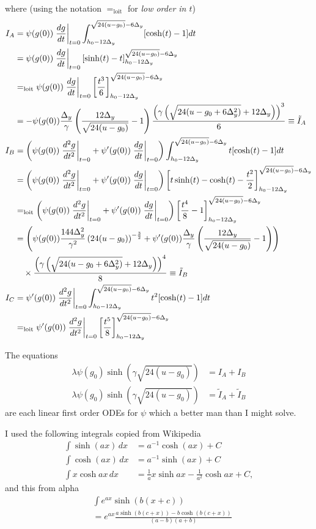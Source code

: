 \documentclass[]{article}
\begin{document}
\newcommand{\loit}{=_\text{loit}}
\newcommand{\DG}{\frac{\Delta_y}{\gamma} \left( \frac{12 \Delta_y}
    { \sqrt{24(u-g_0)} } - 1 \right) }
\newcommand{\DDG}{\frac{144 \Delta^2_y}{\gamma^2} \left(24(u-g_0)
  \right)^{-\frac{3}{2}} }
where (using the notation $\loit$ for \emph{low order in $t$})
\begin{align*}
  I_{A} &= \psi(g(0)) \left. \frac{d g}{d t} \right|_{t=0}
  \INT [\cosh(t) - 1] dt \\
  &= \psi(g(0)) \left. \frac{d g}{d t} \right|_{t=0}
  [\sinh(t) - t]\RANGE \\
  &\loit \psi(g(0)) \left. \frac{d g}{d t} \right|_{t=0}
  \left[\frac{t^3}{6} \right]\RANGE\\
  &= -\psi(g(0)) \DG \frac{ \left( \LOW \right)^3 }{6} \equiv \tilde
  I_A \\
  I_{B} &=  \left(
    \psi(g(0)) \left. \frac{d^2 g}{d t^2} \right|_{t=0}
    + \psi'(g(0)) \left. \frac{d g}{d t} \right|_{t=0}
  \right)
  \INT t [\cosh(t) - 1] dt \\
  &=  \left(
    \psi(g(0)) \left. \frac{d^2 g}{d t^2} \right|_{t=0}
    + \psi'(g(0)) \left. \frac{d g}{d t} \right|_{t=0}
  \right)
  \left[ t\sinh(t) - \cosh(t) - \frac{t^2}{2} \right] \RANGE \\
  &\loit  \left(
    \psi(g(0)) \left. \frac{d^2 g}{d t^2} \right|_{t=0}
    + \psi'(g(0)) \left. \frac{d g}{d t} \right|_{t=0}
  \right)
  \left[ \frac{t^4}{8} -1 \right]\RANGE \\
  &= \left( \psi(g(0)) \DDG + \psi'(g(0)) \DG \right) \\
  &\quad \times \frac{ \left( \LOW \right)^4 }{8} \equiv \tilde I_B\\
  I_{C} &= \psi'(g(0)) \left. \frac{d^2 g}{d t^2} \right|_{t=0}
  \INT t^2 [\cosh(t) - 1 ]dt \\
  &\loit \psi'(g(0)) \left. \frac{d^2 g}{d t^2} \right|_{t=0} \left[
    \frac{ t^5 }{ 8 } \right]\RANGE
\end{align*}

The equations
\begin{align*}
  \lambda \psi(g_0) \sinh\left(\gamma \sqrt{24(u-g_0)} \right) &= I_A
  + I_B \\
  \lambda \psi(g_0) \sinh\left(\gamma \sqrt{24(u-g_0)} \right) &=
  \tilde I_A + \tilde I_B
\end{align*}
are each linear first order ODEs for $\psi$ which a better man than I
might solve.

I used the following integrals copied from Wikipedia
\begin{align*}
  \int \sinh (ax)\,dx &= a^{-1} \cosh (ax) + C \\
  \int \cosh (ax)\,dx &= a^{-1} \sinh (ax) + C \\
  \int x\cosh ax\,dx &= \frac{1}{a} x\sinh ax - \frac{1}{a^2}\cosh
  ax+C,
\end{align*} 
and this from alpha
\begin{align*}
  & \int e^{ax} \sinh(b(x+c)) \\
  &= e^{ax} \frac{a \sinh(b(c+x)) - b \cosh(b(c+x))}{(a-b)(a+b)}
\end{align*}
\end{document}
